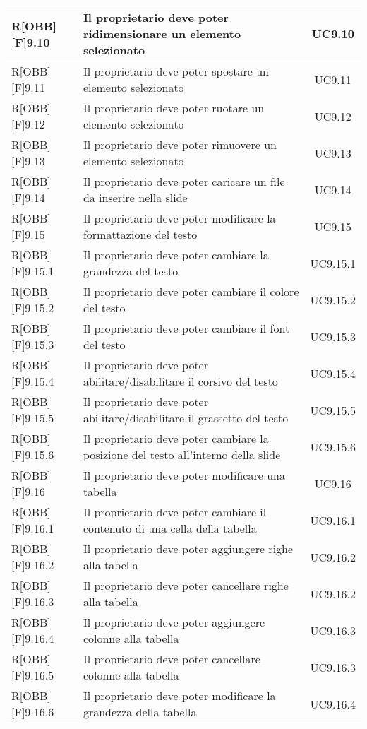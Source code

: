 \begin{center}
\begin{table}[h]
\begin{tabular}{|l|p{}|c|}
		R[OBB][F]9.10 & Il proprietario deve poter ridimensionare un elemento selezionato & UC9.10 \\ \midrule
		R[OBB][F]9.11 & Il proprietario deve poter spostare un elemento selezionato & UC9.11 \\ \midrule
		R[OBB][F]9.12 & Il proprietario deve poter ruotare un elemento selezionato & UC9.12 \\ \midrule
		R[OBB][F]9.13 & Il proprietario deve poter rimuovere un elemento selezionato & UC9.13 \\ \midrule
		R[OBB][F]9.14 & Il proprietario deve poter caricare un file da inserire nella slide & UC9.14 \\ \midrule
		
		R[OBB][F]9.15 & Il proprietario deve poter modificare la formattazione del testo & UC9.15 \\ \midrule
		R[OBB][F]9.15.1 & Il proprietario deve poter cambiare la grandezza del testo & UC9.15.1 \\ \midrule
		R[OBB][F]9.15.2 & Il proprietario deve poter cambiare il colore del testo & UC9.15.2 \\ \midrule
		R[OBB][F]9.15.3 & Il proprietario deve poter cambiare il font del testo & UC9.15.3 \\ \midrule
		R[OBB][F]9.15.4 & Il proprietario deve poter abilitare/disabilitare il corsivo del testo & UC9.15.4 \\ \midrule
		R[OBB][F]9.15.5 & Il proprietario deve poter abilitare/disabilitare il grassetto del testo & UC9.15.5 \\ \midrule
		R[OBB][F]9.15.6 & Il proprietario deve poter cambiare la posizione del testo all'interno della slide & UC9.15.6 \\ \midrule
		
		R[OBB][F]9.16 & Il proprietario deve poter modificare una tabella & UC9.16 \\ \midrule
		R[OBB][F]9.16.1 & Il proprietario deve poter cambiare il contenuto di una cella della tabella & UC9.16.1 \\ \midrule
		R[OBB][F]9.16.2 & Il proprietario deve poter aggiungere righe alla tabella & UC9.16.2 \\ \midrule
		R[OBB][F]9.16.3 & Il proprietario deve poter cancellare righe alla tabella & UC9.16.2 \\ \midrule
		R[OBB][F]9.16.4 & Il proprietario deve poter aggiungere colonne alla tabella & UC9.16.3 \\ \midrule
		R[OBB][F]9.16.5 & Il proprietario deve poter cancellare colonne alla tabella & UC9.16.3 \\ \midrule
		R[OBB][F]9.16.6 & Il proprietario deve poter modificare la grandezza della tabella & UC9.16.4 \\ \midrule
		

\end{tabular}
\end{table}
\end{center}
